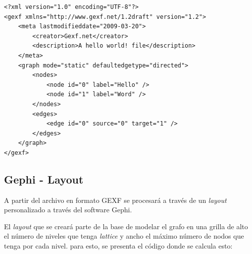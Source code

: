 \documentclass[12pt,oneside,letterpaper]{book}
\newcommand{\eng}[1]{\textit{#1}\xspace}			%
\newcommand{\abr}[1]{\textsc{#1}\xspace}           %
\theoremstyle{definition}
\begin{document}
\begin{lstlisting}
<?xml version="1.0" encoding="UTF-8"?>
<gexf xmlns="http://www.gexf.net/1.2draft" version="1.2">
    <meta lastmodifieddate="2009-03-20">
        <creator>Gexf.net</creator>
        <description>A hello world! file</description>
    </meta>
    <graph mode="static" defaultedgetype="directed">
        <nodes>
            <node id="0" label="Hello" />
            <node id="1" label="Word" />
        </nodes>
        <edges>
            <edge id="0" source="0" target="1" />
        </edges>
    </graph>
</gexf>
\end{lstlisting}


\subsection{Gephi - Layout}
\label{sub:gephi_layout}
A partir del archivo en formato \abr{GEXF} se procesará a través de un \eng{layout} personalizado a través del software Gephi.

El \eng{layout} que se creará parte de la base de modelar el grafo en una grilla de alto el número de niveles que tenga \eng{ lattice} y ancho el máximo número de nodos que tenga por cada nivel. para esto, se presenta el código donde se calcula esto:
\end{document}
